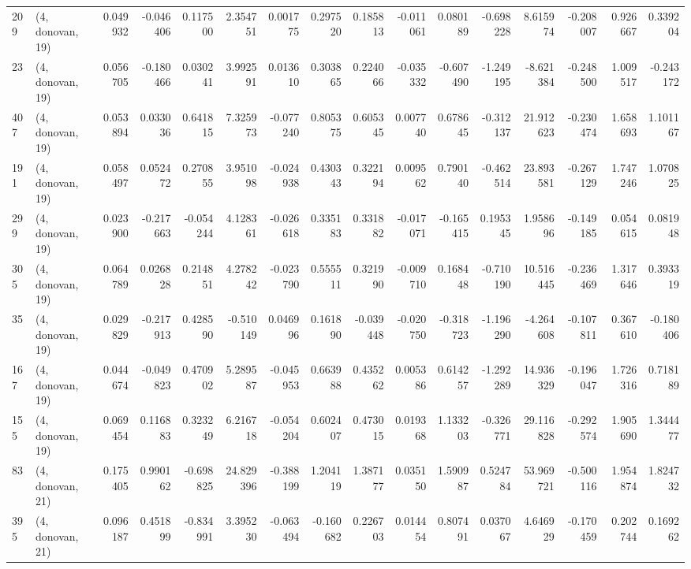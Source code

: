 \begin{tabular}{llrrrrrrrrrrrrrr}
209 &  (4, donovan, 19) &   0.049932 & -0.046406 &  0.117500 &    2.354751 &  0.001775 &   0.297520 &  0.185813 & -0.011061 &  0.080189 & -0.698228 &    8.615974 & -0.208007 &  0.926667 &  0.339204 \\
23  &  (4, donovan, 19) &   0.056705 & -0.180466 &  0.030241 &    3.992591 &  0.013610 &   0.303865 &  0.224066 & -0.035332 & -0.607490 & -1.249195 &   -8.621384 & -0.248500 &  1.009517 & -0.243172 \\
407 &  (4, donovan, 19) &   0.053894 &  0.033036 &  0.641815 &    7.325973 & -0.077240 &   0.805375 &  0.605345 &  0.007740 &  0.678645 & -0.312137 &   21.912623 & -0.230474 &  1.658693 &  1.101167 \\
191 &  (4, donovan, 19) &   0.058497 &  0.052472 &  0.270855 &    3.951098 & -0.024938 &   0.430343 &  0.322194 &  0.009562 &  0.790140 & -0.462514 &   23.893581 & -0.267129 &  1.747246 &  1.070825 \\
299 &  (4, donovan, 19) &   0.023900 & -0.217663 & -0.054244 &    4.128361 & -0.026618 &   0.335183 &  0.331882 & -0.017071 & -0.165415 &  0.195345 &    1.958696 & -0.149185 &  0.054615 &  0.081948 \\
305 &  (4, donovan, 19) &   0.064789 &  0.026828 &  0.214851 &    4.278242 & -0.023790 &   0.555511 &  0.321990 & -0.009710 &  0.168448 & -0.710190 &   10.516445 & -0.236469 &  1.317646 &  0.393319 \\
35  &  (4, donovan, 19) &   0.029829 & -0.217913 &  0.428590 &   -0.510149 &  0.046996 &   0.161890 & -0.039448 & -0.020750 & -0.318723 & -1.196290 &   -4.264608 & -0.107811 &  0.367610 & -0.180406 \\
167 &  (4, donovan, 19) &   0.044674 & -0.049823 &  0.470902 &    5.289587 & -0.045953 &   0.663988 &  0.435262 &  0.005386 &  0.614257 & -1.292289 &   14.936329 & -0.196047 &  1.726316 &  0.718189 \\
155 &  (4, donovan, 19) &   0.069454 &  0.116883 &  0.323249 &    6.216718 & -0.054204 &   0.602407 &  0.473015 &  0.019368 &  1.133203 & -0.326771 &   29.116828 & -0.292574 &  1.905690 &  1.344477 \\
83  &  (4, donovan, 21) &   0.175405 &  0.990162 & -0.698825 &   24.829396 & -0.388199 &   1.204119 &  1.387177 &  0.035150 &  1.590987 &  0.524784 &   53.969721 & -0.500116 &  1.954874 &  1.824732 \\
395 &  (4, donovan, 21) &   0.096187 &  0.451899 & -0.834991 &    3.395230 & -0.063494 &  -0.160682 &  0.226703 &  0.014454 &  0.807491 &  0.037067 &    4.646929 & -0.170459 &  0.202744 &  0.169262 \\

\end{tabular}
